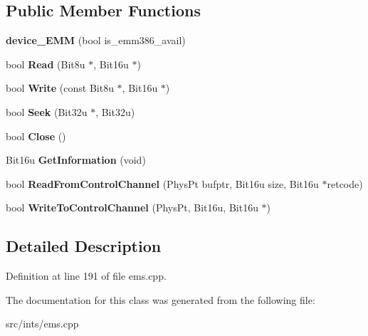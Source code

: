 \subsection*{Public Member Functions}
\begin{DoxyCompactItemize}
\item 
\hypertarget{classdevice__EMM_abe0c07b3c8989251c2c86b710ab83217}{{\bfseries device\-\_\-\-E\-M\-M} (bool is\-\_\-emm386\-\_\-avail)}\label{classdevice__EMM_abe0c07b3c8989251c2c86b710ab83217}

\item 
\hypertarget{classdevice__EMM_a6c62e1a0b8556bf0421d2c4de6eb0e25}{bool {\bfseries Read} (Bit8u $\ast$, Bit16u $\ast$)}\label{classdevice__EMM_a6c62e1a0b8556bf0421d2c4de6eb0e25}

\item 
\hypertarget{classdevice__EMM_a7c0ce70b4f8bc621a5569e30c2abd3d1}{bool {\bfseries Write} (const Bit8u $\ast$, Bit16u $\ast$)}\label{classdevice__EMM_a7c0ce70b4f8bc621a5569e30c2abd3d1}

\item 
\hypertarget{classdevice__EMM_adb3ac540c49174fb7fcc58dcd0d8d91e}{bool {\bfseries Seek} (Bit32u $\ast$, Bit32u)}\label{classdevice__EMM_adb3ac540c49174fb7fcc58dcd0d8d91e}

\item 
\hypertarget{classdevice__EMM_a86c23d668635587cda864ce3d6def05d}{bool {\bfseries Close} ()}\label{classdevice__EMM_a86c23d668635587cda864ce3d6def05d}

\item 
\hypertarget{classdevice__EMM_a08750d12358cc26010295c24066caaac}{Bit16u {\bfseries Get\-Information} (void)}\label{classdevice__EMM_a08750d12358cc26010295c24066caaac}

\item 
\hypertarget{classdevice__EMM_ae6da9c47ea49efe899b779f6ccff23d9}{bool {\bfseries Read\-From\-Control\-Channel} (Phys\-Pt bufptr, Bit16u size, Bit16u $\ast$retcode)}\label{classdevice__EMM_ae6da9c47ea49efe899b779f6ccff23d9}

\item 
\hypertarget{classdevice__EMM_a08952bf66d9a65a44dd399dac20e3895}{bool {\bfseries Write\-To\-Control\-Channel} (Phys\-Pt, Bit16u, Bit16u $\ast$)}\label{classdevice__EMM_a08952bf66d9a65a44dd399dac20e3895}

\end{DoxyCompactItemize}


\subsection{Detailed Description}


Definition at line 191 of file ems.\-cpp.



The documentation for this class was generated from the following file\-:\begin{DoxyCompactItemize}
\item 
src/ints/ems.\-cpp\end{DoxyCompactItemize}
